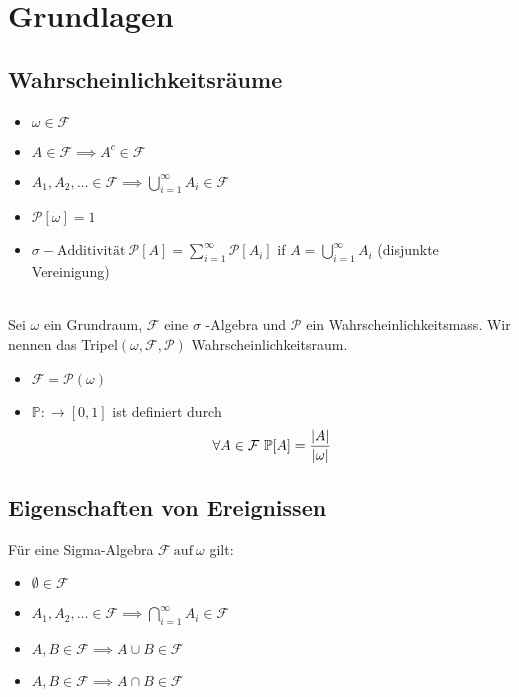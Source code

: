 \section{Grundlagen}
\subsection[]{Wahrscheinlichkeitsräume}
\begin{itemize}
    \item \(\omega \in \mathcal{F}\)
    \item  \(A \in \mathcal{F} \implies A^c \in \mathcal{F}\)
    \item \(A_1, A_2, \dots \in \mathcal{F} \implies \bigcup_{i=1}^{\infty} A_i \in \mathcal{F} \)
\end{itemize}
\Def[1.2 Wahrscheinlichkeitsmass ]
\begin{itemize}
    \item \( \mathcal{P}[\omega] = 1\)
    \item \(\sigma-\text{Additivität} \ \mathcal{P}[A] = \sum_{i=1}^{\infty} \mathcal{P}[A_i]\) \newline if \( A = \bigcup_{i=1}^{\infty} A_i \) (disjunkte Vereinigung)
\end{itemize}
\Def[1.3 Wahrscheinlichkeitsraum ] \\
Sei \( \omega \) ein Grundraum, \(\mathcal{F}\) eine \(\sigma\) -Algebra und \(\mathcal{P}\) ein Wahrscheinlichkeitsmass. Wir nennen das Tripel\( (\omega, \mathcal{F}, \mathcal{P})\)  Wahrscheinlichkeitsraum.
 \\
\begin{itemize}
    \item \(\mathcal{F} = \mathcal{P}(\omega)\)
    \item \(\mathbb{P} : \rightarrow \left[0,1\right]\) ist definiert durch \[ \forall A \in \mathcal{F} \ \mathbb{P}[A] = \frac{\left\lvert A \right\rvert}{\left\lvert \omega \right\rvert}\]
\end{itemize}
\subsection{Eigenschaften von Ereignissen}
\Satz[1.6]
Für eine Sigma-Algebra \(\mathcal{F} \ \text{auf} \ \omega\) gilt:
\begin{itemize}
    \item \(\emptyset \in \mathcal{F}\)
    \item \(A_1, A_2, \dots \in \mathcal{F} \implies \bigcap_{i=1}^{\infty} A_i \in \mathcal{F}\)
    \item \(A,B \in \mathcal{F} \implies A \cup B \in \mathcal{F}\)
    \item \(A,B \in \mathcal{F} \implies A \cap B \in \mathcal{F}\)
\end{itemize}
